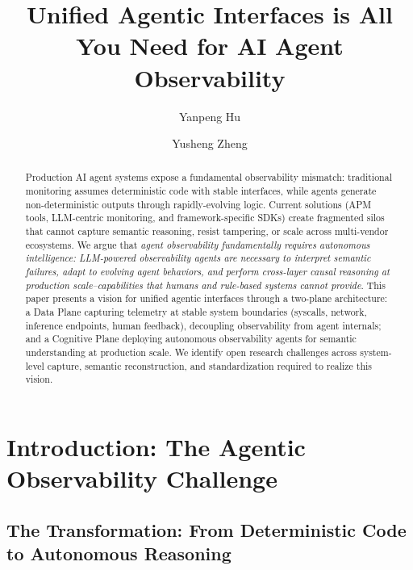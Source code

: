 \documentclass[sigplan,screen,9pt]{acmart}
\begin{document}
\title{Unified Agentic Interfaces is All You Need for AI Agent Observability}

\author{Yanpeng Hu}

\author{Yusheng Zheng}


\sloppy
\begin{abstract}
Production AI agent systems expose a fundamental observability mismatch: traditional monitoring assumes deterministic code with stable interfaces, while agents generate non-deterministic outputs through rapidly-evolving logic. Current solutions (APM tools, LLM-centric monitoring, and framework-specific SDKs) create fragmented silos that cannot capture semantic reasoning, resist tampering, or scale across multi-vendor ecosystems. We argue that \emph{agent observability fundamentally requires autonomous intelligence: LLM-powered observability agents are necessary to interpret semantic failures, adapt to evolving agent behaviors, and perform cross-layer causal reasoning at production scale--capabilities that humans and rule-based systems cannot provide}. This paper presents a vision for unified agentic interfaces through a two-plane architecture: a Data Plane capturing telemetry at stable system boundaries (syscalls, network, inference endpoints, human feedback), decoupling observability from agent internals; and a Cognitive Plane deploying autonomous observability agents for semantic understanding at production scale. We identify open research challenges across system-level capture, semantic reconstruction, and standardization required to realize this vision.
\end{abstract}


\maketitle



\section{Introduction: The Agentic Observability Challenge}

\subsection{The Transformation: From Deterministic Code to Autonomous Reasoning}
\end{document}
